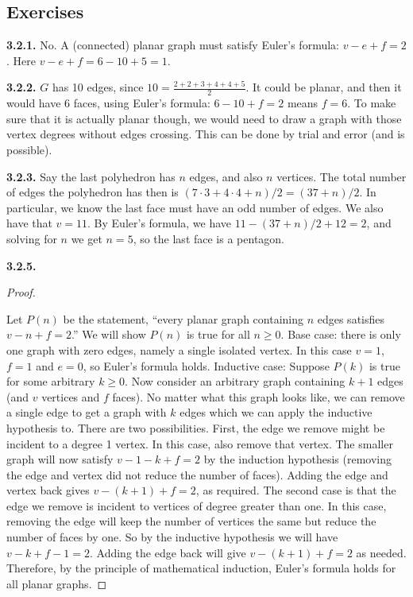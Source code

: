 \documentclass[12pt,]{book}
\theoremstyle{plain}
\theoremstyle{definition}
\theoremstyle{definition}
\theoremstyle{definition}
\numberwithin{equation}{chapter}
\begin{document}
\subsection*{ Exercises}
\noindent\textbf{3.2.1.} \hypertarget{p-1656}{}%
No. A (connected) planar graph must satisfy Euler's formula: \(v - e + f = 2\). Here \(v - e + f = 6 - 10 + 5 = 1\).%
\par\smallskip
\noindent\textbf{3.2.2.} \hypertarget{p-1658}{}%
\(G\) has 10 edges, since \(10 = \frac{2+2+3+4+4+5}{2}\). It could be planar, and then it would have 6 faces, using Euler's formula: \(6-10+f = 2\) means \(f = 6\).  To make sure that it is actually planar though, we would need to draw a graph with those vertex degrees without edges crossing.  This can be done by trial and error (and is possible).%
\par\smallskip
\noindent\textbf{3.2.3.} \hypertarget{p-1660}{}%
Say the last polyhedron has \(n\) edges, and also \(n\) vertices. The total number of edges the polyhedron has then is \((7 \cdot 3 + 4 \cdot 4 + n)/2 = (37 + n)/2\). In particular, we know the last face must have an odd number of edges. We also have that \(v = 11 \).  By Euler's formula, we have \(11 - (37+n)/2 + 12 = 2\), and solving for \(n\) we get \(n = 5\), so the last face is a pentagon.%
\par\smallskip
\noindent\textbf{3.2.5.} \begin{proof}\hypertarget{proof-41}{}
\hypertarget{p-1666}{}%
Let \(P(n)\) be the statement, ``every planar graph containing \(n\) edges satisfies \(v - n + f = 2\).'' We will show \(P(n)\) is true for all \(n \ge 0\). Base case: there is only one graph with zero edges, namely a single isolated vertex. In this case \(v = 1\), \(f = 1\) and \(e = 0\), so Euler's formula holds. Inductive case: Suppose \(P(k)\) is true for some arbitrary \(k \ge 0\). Now consider an arbitrary graph containing \(k+1\) edges (and \(v\) vertices and \(f\) faces). No matter what this graph looks like, we can remove a single edge to get a graph with \(k\) edges which we can apply the inductive hypothesis to. There are two possibilities. First, the edge we remove might be incident to a degree 1 vertex. In this case, also remove that vertex. The smaller graph will now satisfy \(v-1 - k + f = 2\) by the induction hypothesis (removing the edge and vertex did not reduce the number of faces). Adding the edge and vertex back gives \(v - (k+1) + f = 2\), as required. The second case is that the edge we remove is incident to vertices of degree greater than one. In this case, removing the edge will keep the number of vertices the same but reduce the number of faces by one. So by the inductive hypothesis we will have \(v - k + f-1 = 2\). Adding the edge back will give \(v - (k+1) + f = 2\) as needed. Therefore, by the principle of mathematical induction, Euler's formula holds for all planar graphs.%
\end{proof}
\end{document}
